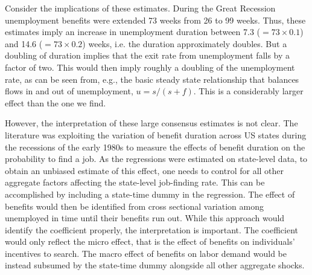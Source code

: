 \documentclass[12pt]{article}
\newcommand{\1}{\mathbf{1}}
\begin{document}
\begin{appendix}
Consider the implications of these estimates. During the Great Recession unemployment benefits were extended 73 weeks from 26 to 99 weeks. Thus, these estimates imply an increase in unemployment duration between  7.3 ($=73\times 0.1$) and 14.6 ($=73\times 0.2$) weeks, i.e. the duration approximately doubles. But a doubling of duration implies that the exit rate from unemployment falls by a factor of two. This would then imply roughly a doubling of the unemployment rate, as can be seen from, e.g., the basic steady state relationship that balances flows in and out of unemployment, $u=s/(s+f)$. This is a considerably larger effect than the one we find.





However, the interpretation of these large consensus estimates is not clear. The literature was exploiting the variation of benefit duration across US states during the recessions of the early 1980s to measure the effects of benefit duration on the probability to find a job. As the regressions were estimated on state-level data, to obtain an unbiased estimate of this effect, one needs to control for all other aggregate factors affecting the state-level job-finding rate. This can be accomplished by including a state-time dummy in the regression. The effect of benefits would then be identified from cross sectional variation among unemployed in time until their benefits run out. While this approach would identify the coefficient properly, the interpretation is important. The coefficient would only reflect the micro effect, that is the effect of benefits on individuals' incentives to search. The macro effect of benefits on labor demand would be instead subsumed by the state-time dummy alongside all other aggregate shocks.






\end{appendix}
\end{document}
